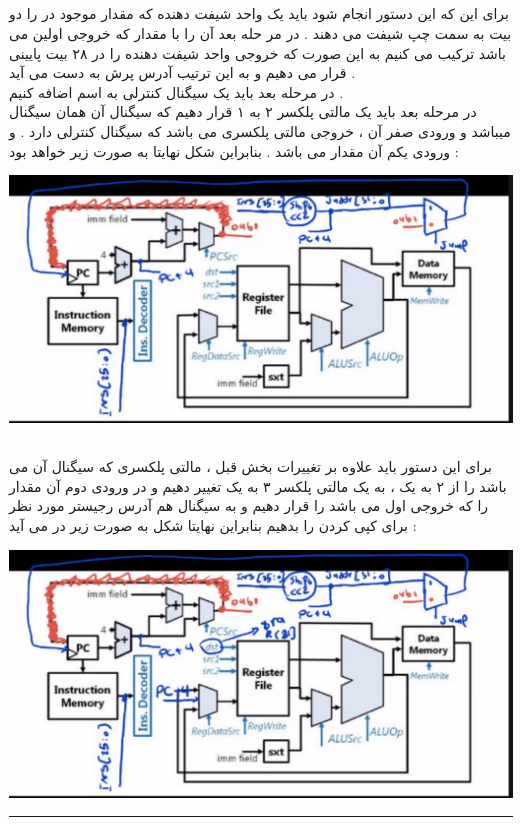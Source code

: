 \documentclass{article}
\begin{document}
\subsection*{\textcolor{red}{}}
برای این که این دستور انجام شود باید یک واحد شیفت دهنده که مقدار موجود در 
را دو بیت به سمت چپ شیفت می دهند  .  در مر حله بعد آن را با مقدار 
که خروجی اولین 
می باشد ترکیب می کنیم به این صورت که خروجی واحد شیفت دهنده را در ۲۸ بیت پایینی 
قرار می دهیم و به این ترتیب آدرس پرش به دست می آید  . 
\\
در مرحله بعد باید یک سیگنال کنترلی به اسم 
اضافه کنیم  . 
\\
در مرحله بعد باید یک مالتی پلکسر ۲ به ۱ قرار دهیم که سیگنال 
آن همان سیگنال 
میباشد و ورودی صفر آن ، خروجی مالتی پلکسری می باشد که سیگنال کنترلی 
دارد . و ورودی یکم آن مقدار 
می باشد . بنابراین شکل نهایتا به صورت زیر خواهد بود  : 
\begin{center}
	\includegraphics[width=1\textwidth]{jar}
\end{center}
\subsection*{\textcolor{red}{}}
برای این دستور باید علاوه بر تغییرات بخش قبل ، مالتی پلکسری که سیگنال 
آن 
می باشد را از ۲ به یک ، به یک مالتی پلکسر ۳ به یک تغییر دهیم و در ورودی دوم آن مقدار 
را که خروجی 
اول می باشد را قرار دهیم و به سیگنال 
هم آدرس رجیستر مورد نظر برای کپی کردن را بدهیم 
بنابراین نهایتا شکل به صورت زیر در می آید  : 
\begin{center}
	\includegraphics[width=1\textwidth]{jal}
\end{center}
\hrule
\end{document}
